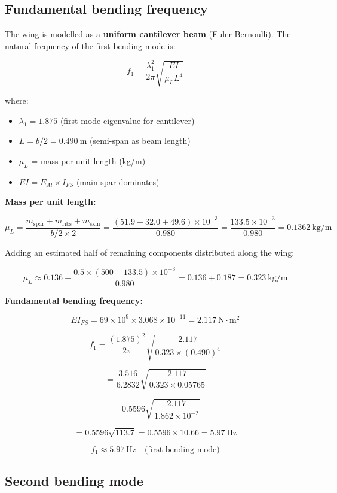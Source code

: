 \documentclass[10pt,a4paper]{article}
\begin{document}
\subsection{Fundamental bending frequency}

The wing is modelled as a \textbf{uniform cantilever beam} (Euler-Bernoulli). The natural frequency of the first bending mode is:

\[
f_1 = \frac{\lambda_1^2}{2\pi} \sqrt{\frac{EI}{\mu_L L^4}}
\]

where:
\begin{itemize}[noitemsep,topsep=2pt]
\item $\lambda_1 = 1.875$ (first mode eigenvalue for cantilever)
\item $L = b/2 = 0.490\ \text{m}$ (semi-span as beam length)
\item $\mu_L$ = mass per unit length (kg/m)
\item $EI = E_{Al} \times I_{FS}$ (main spar dominates)
\end{itemize}

\textbf{Mass per unit length:}

\[
\mu_L = \frac{m_{\text{spar}} + m_{\text{ribs}} + m_{\text{skin}}}{b/2 \times 2} = \frac{(51.9 + 32.0 + 49.6) \times 10^{-3}}{0.980} = \frac{133.5 \times 10^{-3}}{0.980} = 0.1362\ \text{kg/m}
\]

Adding an estimated half of remaining components distributed along the wing:

\[
\mu_L \approx 0.136 + \frac{0.5 \times (500 - 133.5) \times 10^{-3}}{0.980} = 0.136 + 0.187 = 0.323\ \text{kg/m}
\]

\textbf{Fundamental bending frequency:}

\[
EI_{FS} = 69 \times 10^9 \times 3.068 \times 10^{-11} = 2.117\ \text{N}\cdot\text{m}^2
\]

\[
f_1 = \frac{(1.875)^2}{2\pi} \sqrt{\frac{2.117}{0.323 \times (0.490)^4}}
\]

\[
= \frac{3.516}{6.2832} \sqrt{\frac{2.117}{0.323 \times 0.05765}}
\]

\[
= 0.5596 \sqrt{\frac{2.117}{1.862 \times 10^{-2}}}
\]

\[
= 0.5596 \sqrt{113.7} = 0.5596 \times 10.66 = 5.97\ \text{Hz}
\]

\[
\boxed{f_1 \approx 5.97\ \text{Hz} \quad \text{(first bending mode)}}
\]


\subsection{Second bending mode}
\end{document}
